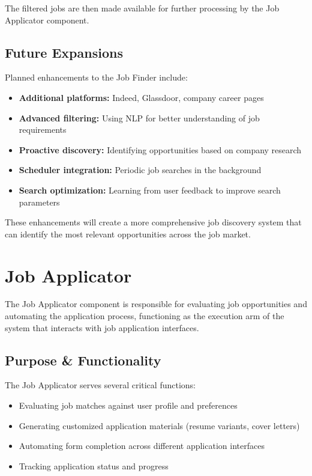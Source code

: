 \documentclass[a4paper,12pt]{article}
\begin{document}
The filtered jobs are then made available for further processing by the Job Applicator component.

\subsection{Future Expansions}
Planned enhancements to the Job Finder include:

\begin{itemize}
    \item \textbf{Additional platforms:} Indeed, Glassdoor, company career pages
    \item \textbf{Advanced filtering:} Using NLP for better understanding of job requirements
    \item \textbf{Proactive discovery:} Identifying opportunities based on company research
    \item \textbf{Scheduler integration:} Periodic job searches in the background
    \item \textbf{Search optimization:} Learning from user feedback to improve search parameters
\end{itemize}

These enhancements will create a more comprehensive job discovery system that can identify the most relevant opportunities across the job market.

\newpage


\section{Job Applicator}

The Job Applicator component is responsible for evaluating job opportunities and automating the application process, functioning as the execution arm of the system that interacts with job application interfaces.

\subsection{Purpose \& Functionality}
The Job Applicator serves several critical functions:

\begin{itemize}
    \item Evaluating job matches against user profile and preferences
    \item Generating customized application materials (resume variants, cover letters)
    \item Automating form completion across different application interfaces
    \item Tracking application status and progress
\end{itemize}
\end{document}
